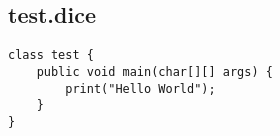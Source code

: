 \subsection{test.dice}
\begin{verbatim}
class test {
	public void main(char[][] args) {
		print("Hello World");
	}
}
\end{verbatim}